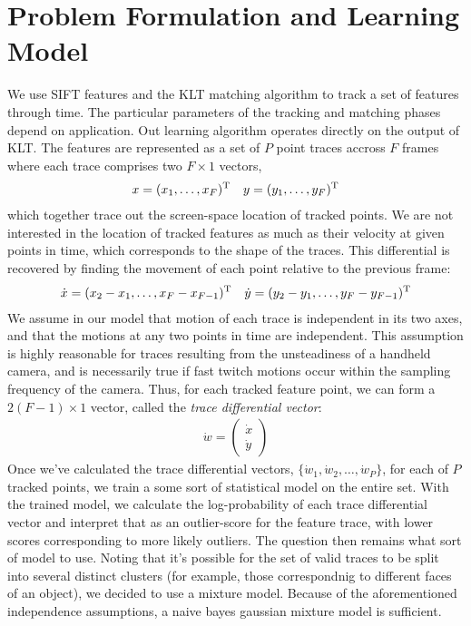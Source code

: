 \section{Problem Formulation and Learning Model}

We use SIFT features and the KLT matching algorithm to track a set of features through time.  The particular parameters of the tracking and matching phases depend on application. 
Out learning algorithm operates directly on the output of KLT.
The features are represented as a set of $P$ point traces accross $F$ frames where each trace comprises two $F\times 1$ vectors,
\begin{align*}
x = (x_1, \ldots, x_F)^{\rm T} && y = (y_1, \ldots, y_F)^{\rm T}
\end{align*}
which together trace out the screen-space location of tracked points.  We are not interested in the location of tracked features as much as their velocity at given points in time, which corresponds to the shape of the traces.  This differential is recovered by finding the movement of each point relative to the previous frame:
\begin{align*}
\dot x = (x_2-x_1, \ldots, x_F-x_{F-1})^{\rm T} && \dot y = (y_2-y_1, \ldots, y_F-y_{F-1})^{\rm T}
\end{align*}
We assume in our model that motion of each trace is independent in its two axes, and that the motions at any two points in time are independent.  This assumption is highly reasonable for traces resulting from the unsteadiness of a handheld camera, and is necessarily true if fast twitch motions occur within the sampling frequency of the camera.  Thus, for each tracked feature point, we can form a $2(F-1)\times 1$ vector, called the {\it trace differential vector}:
\begin{align*}
\dot w = \left( \begin{array}{c}\dot x \\ \dot y\end{array} \right)
\end{align*}
Once we've calculated the trace differential vectors, $\{\dot w_1, \dot w_2, \ldots , \dot w_P\}$, for each of $P$ tracked points, we train a some sort of statistical model on the entire set.  With the trained model, we calculate the log-probability of each trace differential vector and interpret that as an outlier-score for the feature trace, with lower scores corresponding to more likely outliers.  The question then remains what sort of model to use.  Noting that it's possible for the set of valid traces to be split into several distinct clusters (for example, those correspondnig to different faces of an object), we decided to use a mixture model.  Because of the aforementioned independence assumptions, a naive bayes gaussian mixture model is sufficient.  


